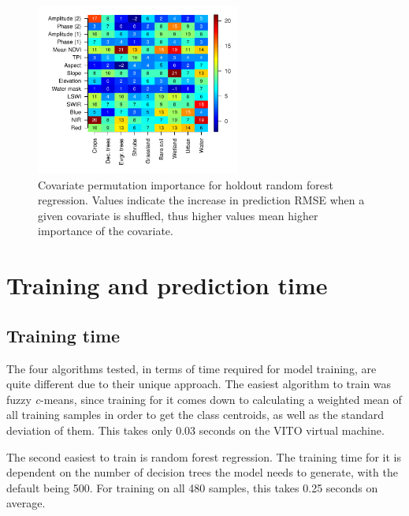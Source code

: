 \documentclass[a4paper,12pt]{scrbook}
\begin{document}
\begin{figure}
  \centering
  \includegraphics[width=0.6\textwidth]{thesis-figures/variable-importance}
  \caption{Covariate permutation importance for holdout random forest regression. Values indicate the increase in prediction RMSE when a given covariate is shuffled, thus higher values mean higher importance of the covariate.}
  \label{fig-variable-importance}
\end{figure}

\section{Training and prediction time}

\subsection{Training time}

The four algorithms tested, in terms of time required for model training, are quite different due to their unique approach. The easiest algorithm to train was fuzzy \textit{c}-means, since training for it comes down to calculating a weighted mean of all training samples in order to get the class centroids, as well as the standard deviation of them. This takes only 0.03 seconds on the VITO virtual machine.

The second easiest to train is random forest regression. The training time for it is dependent on the number of decision trees the model needs to generate, with the default being 500. For training on all 480 samples, this takes 0.25 seconds on average.
\end{document}
